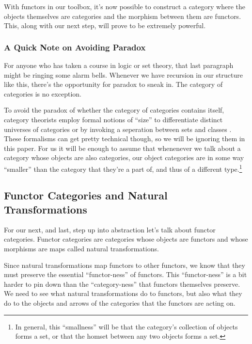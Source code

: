 \documentclass[12pt]{article}
\begin{document}
With functors in our toolbox, it's now possible to construct a category where the objects themselves are categories and the morphism between them are functors.
This, along with our next step, will prove to be extremely powerful.

\subsubsection*{A Quick Note on Avoiding Paradox}
For anyone who has taken a course in logic or set theory, that last paragraph might be ringing some alarm bells.
Whenever we have recursion in our structure like this, there's the opportunity for paradox to sneak in.
The category of categories is no exception.

To avoid the paradox of whether the category of categories contains itself, category theorists employ formal notions of ``size'' to differentiate distinct universes of categories or by invoking a seperation between sets and classes \cite{goldblatt2014topoi, riehl2017category}.
These formalisms can get pretty technical though, so we will be ignoring them in this paper.
For us it will be enough to assume that whenenever we talk about a category whose objects are also categories, our object categories are in some way ``smaller'' than the category that they're a part of, and thus of a different type.\footnote{In general, this ``smallness'' will be that the category's collection of objects forms a set, or that the homset between any two objects forms a set.}

\subsection*{Functor Categories and Natural Transformations}
For our next, and last, step up into abstraction let's talk about functor categories.
Functor categories are categories whose objects are functors and whose morphisms are maps called natural transformations.

Since natural transformations map functors to other functors, we know that they must preserve the essential ``functor-ness'' of functors.
This ``functor-ness'' is a bit harder to pin down than the ``category-ness'' that functors themselves preserve.
We need to see what natural transformations do to functors, but also what they do to the objects and arrows of the categories that the functors are acting on.
\end{document}
